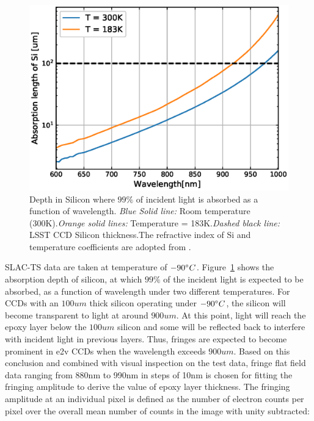 \documentclass[twocolumn]{aastex63} %
\begin{document}
\begin{CJK*}{UTF8}{gbsn}
\begin{figure}[tb]
\centering
\includegraphics[scale = 0.45]{Si_Absorption_length.eps}
\caption{Depth in Silicon where $99\%$ of incident light is absorbed as a function of wavelength. {\it Blue Solid line:} Room temperature (300K).{\it Orange solid lines:} Temperature = 183K.{\it Dashed black line:} LSST CCD Silicon thickness.The refractive index of Si and temperature coefficients are adopted from \citet{Green08}.} 
\label{fig:Si_ab_length}
\end{figure}
SLAC-TS data are taken at temperature of $-90 \degree C$. Figure~\ref{fig:Si_ab_length} shows the absorption depth of silicon, at which $99\%$ of the incident light is expected to be absorbed, as a function of wavelength under two different temperatures. For CCDs with an $100um$ thick silicon operating under $-90 \degree C$, the silicon will become transparent to light at around $900um$. At this point, light will reach the epoxy layer below the $100um$ silicon and some will be reflected back to interfere with incident light in previous layers. Thus, fringes are expected to become prominent in e2v CCDs when the wavelength exceeds $900um$. Based on this conclusion and combined with visual inspection on the test data, fringe flat field data ranging from 880nm to 990nm in steps of 10nm is chosen for fitting the fringing amplitude to derive the value of epoxy layer thickness. The fringing amplitude at an individual pixel is defined as the number of electron counts per pixel over the overall mean number of counts in the image with unity subtracted:


\end{CJK*}
\end{document}
